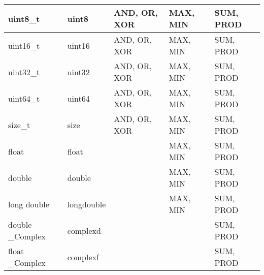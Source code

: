 \begin{apidefinition}
\begin{table}[h]
\begin{center}
\begin{tabular}{|l|l|l|l|l|}
      uint8\_t           & uint8      & AND, OR, XOR & MAX, MIN & SUM, PROD \\ \hline
      uint16\_t          & uint16     & AND, OR, XOR & MAX, MIN & SUM, PROD \\ \hline
      uint32\_t          & uint32     & AND, OR, XOR & MAX, MIN & SUM, PROD \\ \hline
      uint64\_t          & uint64     & AND, OR, XOR & MAX, MIN & SUM, PROD \\ \hline
      size\_t            & size       & AND, OR, XOR & MAX, MIN & SUM, PROD \\ \hline
      float              & float      &              & MAX, MIN & SUM, PROD \\ \hline
      double             & double     &              & MAX, MIN & SUM, PROD \\ \hline
      long double        & longdouble &              & MAX, MIN & SUM, PROD \\ \hline
      double \_Complex   & complexd   &              &          & SUM, PROD \\ \hline
      float  \_Complex   & complexf   &              &          & SUM, PROD \\ \hline
    \end{tabular}
    \label{teamreducetypes}
  \end{center}
\end{table}


\end{apidefinition}

